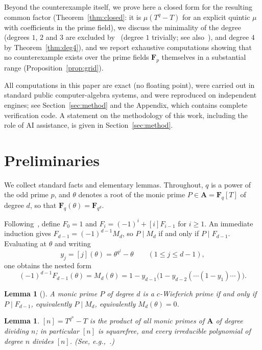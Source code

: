 \documentclass[11pt]{amsart}
\newcommand{\A}{\mathbf{A}}
\newcommand{\F}{\mathbf{F}}
\theoremstyle{plain}
\newtheorem{lemma}[theorem]{Lemma}
\theoremstyle{definition}
\begin{document}
Beyond the counterexample itself, we prove here a closed form for the resulting
common factor (Theorem~\ref{thm:closed}: it is $\mu(T^q-T)$ for an explicit
quintic $\mu$ with coefficients in the prime field), we discuss the minimality
of the degree (degrees $1$, $2$ and $3$ are excluded by~\cite{Tha15} (degree
$1$ trivially; see also~\cite{Bam17}), and degree $4$ by
Theorem~\ref{thm:deg4}), and we report exhaustive computations showing that no
counterexample exists over the prime fields $\F_p$ themselves in a substantial
range (Proposition~\ref{prop:grid}).

All computations in this paper are exact (no floating point), were carried out
in standard public computer-algebra systems, and were reproduced on independent
engines; see Section~\ref{sec:method} and the Appendix, which contains complete
verification code. A statement on the methodology of this work, including the
role of AI assistance, is given in Section~\ref{sec:method}.

\section{Preliminaries}

We collect standard facts and elementary lemmas. Throughout, $q$ is a power of
the odd prime $p$, and $\theta$ denotes a root of the monic prime
$P\in\A=\F_q[T]$ of degree $d$, so that $\F_q(\theta)=\F_{q^d}$.

Following~\cite{BB}, define $F_0=1$ and $F_i=(-1)^i+[i]F_{i-1}$ for $i\ge1$. An
immediate induction gives $F_{d-1}=(-1)^{d-1}M_d$, so $P\mid M_d$ if and only if
$P\mid F_{d-1}$. Evaluating at $\theta$ and writing
\[
y_j=[j](\theta)=\theta^{q^j}-\theta\qquad(1\le j\le d-1),
\]
one obtains the nested form
\begin{equation}\label{eq:nested}
(-1)^{d-1}F_{d-1}(\theta)=M_d(\theta)=1-y_{d-1}\bigl(1-y_{d-2}(\cdots(1-y_1)\cdots)\bigr).
\end{equation}

\begin{lemma}[{\cite[Prop.~1.2]{BB}}]\label{lem:equiv}
A monic prime $P$ of degree $d$ is a $c$-Wieferich prime if and only if
$P\mid F_{d-1}$, equivalently $P\mid M_d$, equivalently $M_d(\theta)=0$.
\end{lemma}

\begin{lemma}\label{lem:sqfree}
$[n]=T^{q^n}-T$ is the product of all monic primes of $\A$ of degree dividing
$n$; in particular $[n]$ is squarefree, and every irreducible polynomial of
degree $n$ divides $[n]$. (See, e.g.,~\cite[Ch.~2]{Ros}.)
\end{lemma}
\end{document}
